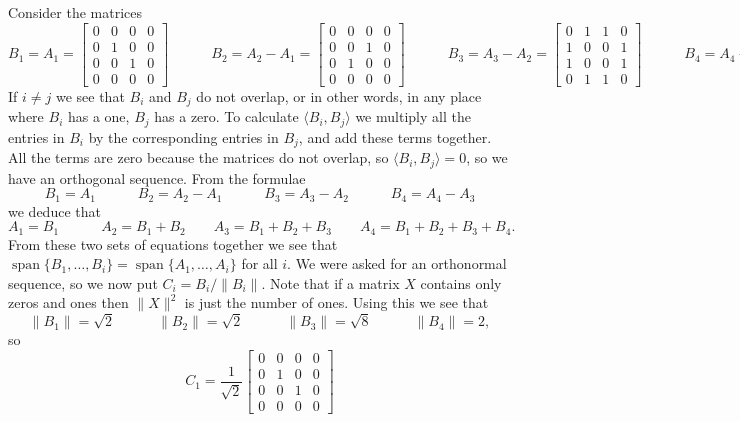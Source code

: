 \documentclass{amsart}
\newcommand{\spn}       {\operatorname{span}}
\newcommand{\bsm}       {\left[\begin{smallmatrix}}
\newcommand{\esm}       {\end{smallmatrix}\right]}
\newcommand{\ip}[1]     {\langle #1\rangle}
\renewcommand{\:}       {\colon}
\theoremstyle{definition}
\renewenvironment{solution}{\SolutionAtEnd}{\endSolutionAtEnd}
\begin{document}
\begin{solution}
 Consider the matrices
 {\tiny \[
  B_1=A_1 = \bsm 0&0&0&0\\ 0&1&0&0\\ 0&0&1&0\\ 0&0&0&0\esm 
  \hspace{3em}
  B_2=A_2-A_1 = \bsm 0&0&0&0\\ 0&0&1&0\\ 0&1&0&0\\ 0&0&0&0\esm 
  \hspace{3em}
  B_3=A_3-A_2 = \bsm 0&1&1&0\\ 1&0&0&1\\ 1&0&0&1\\ 0&1&1&0\esm 
  \hspace{3em}
  B_4=A_4-A_3 = \bsm 1&0&0&1\\ 0&0&0&0\\ 0&0&0&0\\ 1&0&0&1\esm 
 \]}
 If $i\neq j$ we see that $B_i$ and $B_j$ do not overlap, or
 in other words, in any place where $B_i$ has a one, $B_j$
 has a zero.  To calculate $\ip{B_i,B_j}$ we multiply all
 the entries in $B_i$ by the corresponding entries in $B_j$,
 and add these terms together.  All the terms are zero
 because the matrices do not overlap, so $\ip{B_i,B_j}=0$,
 so we have an orthogonal sequence.  From the formulae
 \[ B_1=A_1     \hspace{3em}
    B_2=A_2-A_1 \hspace{3em}
    B_3=A_3-A_2 \hspace{3em}
    B_4=A_4-A_3
 \]
 we deduce that
 \[ A_1=B_1 \hspace{3em}
    A_2=B_1+B_2 \hspace{2em}
    A_3=B_1+B_2+B_3 \hspace{2em}
    A_4=B_1+B_2+B_3+B_4.
 \]
 From these two sets of equations together we see that
 $\spn\{B_1,\dotsc,B_i\}=\spn\{A_1,\dotsc,A_i\}$ for all
 $i$.  We were asked for an orthonormal sequence, so we now
 put $C_i=B_i/\|B_i\|$.  Note that if a matrix $X$ contains
 only zeros and ones then $\|X\|^2$ is just the number of
 ones.  Using this we see that 
 \[ \|B_1\| = \sqrt{2} \hspace{3em}
    \|B_2\| = \sqrt{2} \hspace{3em}
    \|B_3\| = \sqrt{8} \hspace{3em}
    \|B_4\| = 2,
 \]
 so 
 {\tiny \[
  C_1 = \frac{1}{\sqrt{2}} \bsm 0&0&0&0\\ 0&1&0&0\\ 0&0&1&0\\ 0&0&0&0\esm 
\]}
\end{solution}
\end{document}
